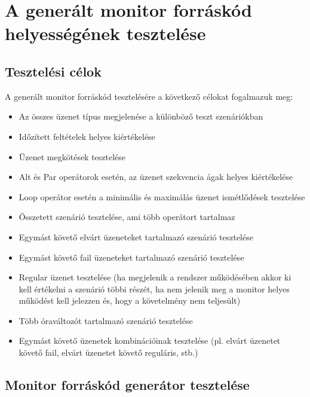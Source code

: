 \chapter{A generált monitor forráskód helyességének tesztelése}

\section{Tesztelési célok}

A generált monitor forráskód tesztelésére a következő célokat fogalmazuk meg:

\begin{itemize}
    \item Az összes üzenet típus megjelenése a különböző teszt szenáriókban
    \item Időzített feltételek helyes kiértékelése
    \item Üzenet megkötések tesztelése
    \item Alt és Par operátorok esetén, az üzenet szekvencia ágak helyes kiértékelése
    \item Loop operátor esetén a minimális és maximálás üzenet ismétlődések tesztelése
    \item Összetett szenárió tesztelése, ami több operátort tartalmaz
    \item Egymást követő elvárt üzeneteket tartalmazó szenárió tesztelése
    \item Egymást követő fail üzeneteket tartalmazó szenárió tesztelése
    \item Regular üzenet tesztelése (ha megjelenik a rendszer működésében akkor ki kell értékelni a szenárió többi részét, ha nem jelenik meg a monitor helyes működést kell jelezzen és, hogy a követelmény nem teljesült)
    \item Több óraváltozót tartalmazó szenárió tesztelése
    \item Egymást követő üzenetek kombinációinak tesztelése (pl. elvárt üzenetet követő fail, elvárt üzenetet követő reguláris, stb.)
\end{itemize}

\clearpage\section{Monitor forráskód generátor tesztelése}

